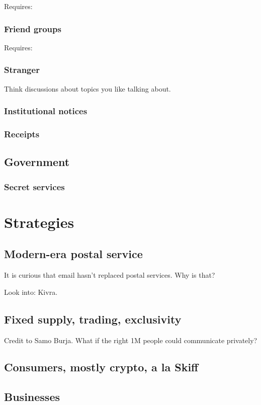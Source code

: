 \documentclass[sigconf, nonacm, balance=false, natbib=false]{acmart}
\begin{document}
Requires:

\subsubsection{Friend groups}

Requires:

\subsubsection{Stranger}

Think discussions about topics you like talking about.

\subsubsection{Institutional notices} %

\subsubsection{Receipts}

\subsection{Government}

\subsubsection{Secret services}

\section{Strategies}

\subsection{Modern-era postal service}

It is curious that email hasn't replaced postal services. Why is that?

Look into: Kivra.

\subsection{Fixed supply, trading, exclusivity}

Credit to Samo Burja. What if the right 1M people could communicate privately?

\subsection{Consumers, mostly crypto, a la Skiff}

\subsection{Businesses}

\printbibliography
\end{document}
